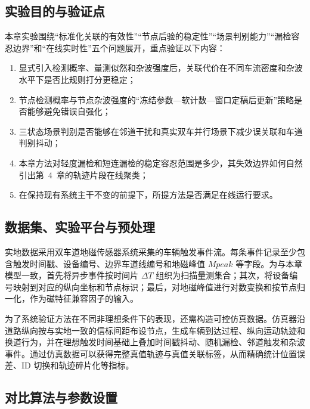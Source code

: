 \documentclass{xdupgthesis}
\begin{document}
\subsection{实验目的与验证点}

本章实验围绕“标准化关联的有效性”“节点后验的稳定性”“场景判别能力”“漏检容忍边界”和“在线实时性”五个问题展开，重点验证以下内容：
\begin{enumerate}
	\item 显式引入检测概率、量测似然和杂波强度后，关联代价在不同车流密度和杂波水平下是否比规则打分更稳定；
	\item 节点检测概率与节点杂波强度的“冻结参数—软计数—窗口定稿后更新”策略是否能够避免错误自强化；
	\item 三状态场景判别是否能够在邻道干扰和真实双车并行场景下减少误关联和车道判别抖动；
	\item 本章方法对轻度漏检和短连漏检的稳定容忍范围是多少，其失效边界如何自然引出第~4~章的轨迹片段在线聚类；
	\item 在保持现有系统主干不变的前提下，所提方法是否满足在线运行要求。
\end{enumerate}

\subsection{数据集、实验平台与预处理}

实地数据采用双车道地磁传感器系统采集的车辆触发事件流。每条事件记录至少包含触发时间戳、设备编号、边界车道线编号和地磁峰值 $Mpeak$ 等字段。为与本章模型一致，首先将异步事件按时间片 $\Delta T$ 组织为扫描量测集合；其次，将设备编号映射到对应的纵向坐标和节点标识；最后，对地磁峰值进行对数变换和按节点归一化，作为磁特征兼容因子的输入。

为了系统验证方法在不同非理想条件下的表现，还需构造可控仿真数据。仿真器沿道路纵向按与实地一致的信标间距布设节点，生成车辆到达过程、纵向运动轨迹和换道行为，并在理想触发时间基础上叠加时间戳抖动、随机漏检、邻道触发和杂波事件。通过仿真数据可以获得完整真值轨迹与真值关联标签，从而精确统计位置误差、ID 切换和轨迹碎片化等指标。

\subsection{对比算法与参数设置}
\end{document}
